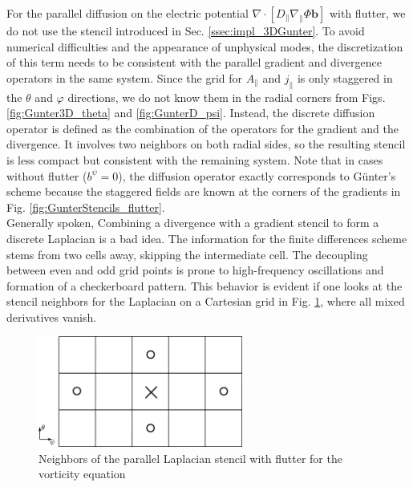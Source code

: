 For the parallel diffusion on the electric potential $\nabla \cdot \left[ D_\parallel \nabla_\parallel \Phi \mathbf{b} \right]$ with flutter, we do not use the stencil introduced in Sec. \ref{ssec:impl_3DGunter}. To avoid numerical difficulties and the appearance of unphysical modes, the discretization of this term needs to be consistent with the parallel gradient and divergence operators in the same system. Since the grid for $A_\parallel$ and $j_\parallel$ is only staggered in the $\theta$ and $\varphi$ directions, we do not know them in the radial corners from Figs. \ref{fig:Gunter3D_theta} and \ref{fig:GunterD_psi}. Instead, the discrete diffusion operator is defined as the combination of the operators for the gradient and the divergence. It involves two neighbors on both radial sides, so the resulting stencil is less compact but consistent with the remaining system. Note that in cases without flutter ($b^\psi = 0$), the diffusion operator exactly corresponds to Günter's scheme \cite{gunter2005} because the staggered fields are known at the corners of the gradients in Fig. \ref{fig:GunterStencils_flutter}. \\

Generally spoken, Combining a divergence with a gradient stencil to form a discrete Laplacian is a bad idea. The information for the finite differences scheme stems from two cells away, skipping the intermediate cell. The decoupling between even and odd grid points is prone to high-frequency oscillations and  formation of a checkerboard pattern. This behavior is evident if one looks at the stencil neighbors for the Laplacian on a Cartesian grid in Fig. \ref{fig:impl_vorticityLaplStencilFlutter}, where all mixed derivatives vanish.

\begin{figure}[H]\centering
	\centering
	\includegraphics[width=0.6\textwidth]{schemes/vorticityLaplacianStencilFlutter.jpg}
	\caption[Neighbors of the parallel Laplacian stencil with flutter for the vorticity equation]{Neighbors of the parallel Laplacian stencil with flutter for the vorticity equation}
	\label{fig:impl_vorticityLaplStencilFlutter}
\end{figure}

